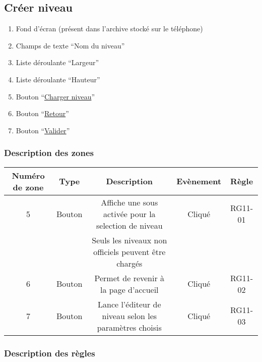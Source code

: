 \documentclass{report}
\begin{document}
\newpage
	
	\subsection{Créer niveau}
		
		\hypertarget{Creer niveau}{}
		\label{Creer niveau}
			
		\begin{center}
			
		\end{center}

		\begin{enumerate}
		  \item Fond d'écran (présent dans l'archive stocké sur le téléphone)
		  \item Champs de texte ``Nom du niveau''
		  \item Liste déroulante ``Largeur''
		  \item Liste déroulante ``Hauteur''
		  \item Bouton ``\hyperlink{Charger}{Charger niveau}''
		  \item Bouton ``\hyperlink{Accueil}{Retour}''
		  \item Bouton ``\hyperlink{Editeur}{Valider}''
		\end{enumerate}

		\subsubsection{Description des zones}
		
			\begin{tabular}{|c|c|c|c|c|} \hline
				Numéro de zone & Type  & Description & Evènement &	Règle \\\hline
				5 & Bouton & Affiche une sous activée pour la selection de niveau & Cliqué & RG11-01 \\
				  &        & Seuls les niveaux non officiels peuvent être chargés &        &         \\\hline
				6 & Bouton & Permet de revenir à la page d'accueil & Cliqué & RG11-02 \\\hline
				7 & Bouton & Lance l'éditeur de niveau selon les paramètres choisis & Cliqué & RG11-03 \\\hline 
			\end{tabular}
			
		\subsubsection{Description des règles}
\end{document}
